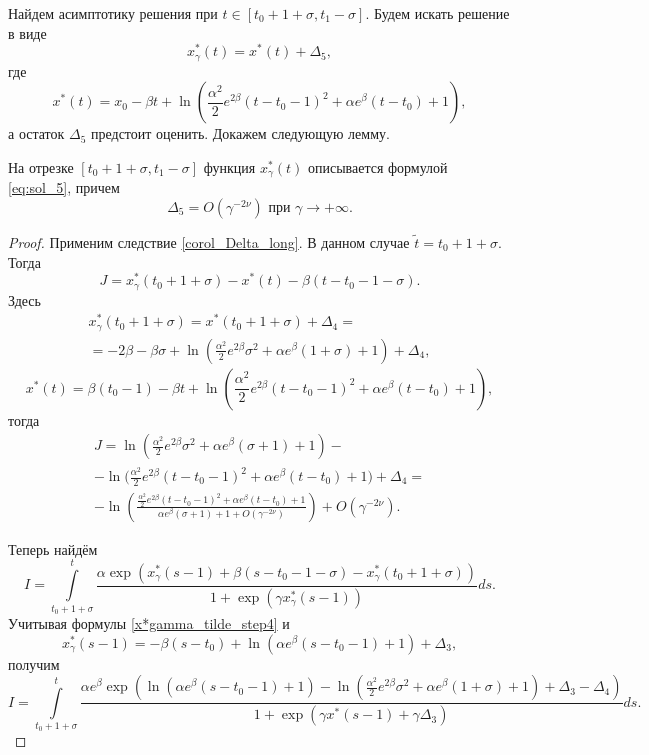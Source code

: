 Найдем асимптотику решения при $t \in [t_0 + 1 + \sigma, t_1 - \sigma]$. Будем искать решение в виде
\begin{equation}
	\label{eq:sol_5}
	x_\gamma^*(t) = x^*(t) + \Delta_5,
\end{equation}
%
где 
\[x^*(t) = x_0 - \beta t + \ln\left(\frac{\alpha^2}{2} e^{2\beta} (t - t_0 - 1)^2 + \alpha e^{\beta}(t - t_0) + 1 \right),\]
а остаток $\Delta_5$ предстоит оценить. Докажем следующую лемму.
%
\begin{lemma}
\label{lem_Delta5}
На отрезке $[t_0 + 1 + \sigma, t_1 - \sigma]$ функция $x_\gamma^*(t)$ описывается формулой \eqref{eq:sol_5}, причем
\[
\Delta_5 = O(\gamma^{-2\nu}) \text{ при } \gamma \to +\infty.
\]
\end{lemma}
\begin{proof}
%
Применим следствие \ref{corol_Delta_long}. В данном случае $\tilde{t} = t_0 + 1 + \sigma$.
Тогда
%
\[
J = x_\gamma^*(t_0+1+\sigma) - x^*(t) - \beta(t - t_0 - 1 - \sigma).
\]
%
Здесь
\begin{multline}
	\label{x*gamma_tilde_step4}
	x_\gamma^*(t_0 + 1 + \sigma) = x^*(t_0 + 1 + \sigma) + \Delta_4 = \\
	= -2 \beta - \beta \sigma + \ln\left(\frac{\alpha^2}{2} e^{2\beta} \sigma^2 + \alpha e^{\beta} (1 + \sigma) + 1 \right) + \Delta_4,
\end{multline}
%
\[
x^*(t) = \beta(t_0 - 1) - \beta t + \ln\left(\frac{\alpha^2}{2} e^{2\beta}(t - t_0 - 1)^2 + \alpha e^{\beta}(t - t_0) + 1\right),
\]
%
тогда
\begin{multline}
	\label{J_step5}
	J = \ln\left(\frac{\alpha^2}{2}e^{2\beta}\sigma^2 + \alpha e^{\beta}(\sigma + 1) + 1 \right) -\\- \ln\Big(\frac{\alpha^2}{2}e^{2\beta}(t - t_0 - 1)^2+\alpha e^{\beta}(t - t_0) + 1 \Big) + \Delta_4=
	\\
	-\ln\left(\frac{\frac{\alpha^2}{2}e^{2\beta}(t - t_0 - 1)^2+\alpha e^{\beta}(t - t_0) + 1}{\alpha e^{\beta}(\sigma + 1) + 1 + O(\gamma^{-2\nu})}\right) + O(\gamma^{-2\nu}).
\end{multline}

Теперь найдём
\begin{equation*}
	I = \int\limits_{t_0 + 1 + \sigma}^{t} \frac{\alpha \exp(x_\gamma^*(s - 1) + \beta(s - t_0 - 1 - \sigma) - x_\gamma^*(t_0 + 1 + \sigma))}{1 + \exp(\gamma x_\gamma^*(s - 1))}ds.
\end{equation*}
Учитывая формулы \eqref{x*gamma_tilde_step4} и
%
\[
x_\gamma^*(s-1) = -\beta (s - t_0) + \ln(\alpha e^{\beta}(s - t_0 - 1) + 1) + \Delta_3,
\]
%
получим
%
\small
\begin{equation*}
	I = \int\limits_{t_0 + 1 + \sigma}^{t}\frac{\alpha e^\beta \exp\left( \ln(\alpha e^{\beta}(s - t_0 - 1) + 1) - \ln(\frac{\alpha^2}{2} e^{2\beta} \sigma^2 + \alpha e^{\beta}(1 + \sigma) + 1) + \Delta_3 - \Delta_4 \right)}{1 + \exp\left(\gamma x^*(s-1)  +\gamma\Delta_3\right)} ds.
\end{equation*}
\normalsize


\end{proof}

